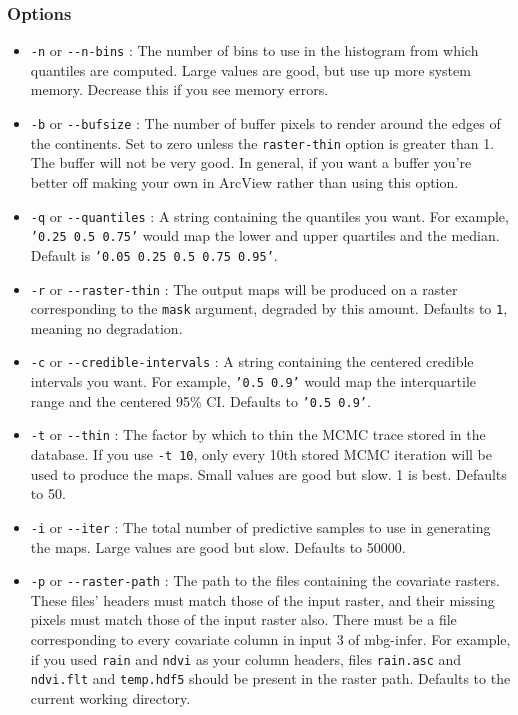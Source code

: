 \subsubsection{Options%
}
%
\begin{itemize}

\item \texttt{-n} or \texttt{-{}-n-bins} : The number of bins to use in the histogram from which quantiles
are computed. Large values are good, but use up more system memory. Decrease this if you
see memory errors.

\item \texttt{-b} or \texttt{-{}-bufsize} : The number of buffer pixels to render around the edges of the
continents. Set to zero unless the \texttt{raster-thin} option is greater than 1. The buffer
will not be very good. In general, if you want a buffer you're better off making your
own in ArcView rather than using this option.

\item \texttt{-q} or \texttt{-{}-quantiles} : A string containing the quantiles you want. For example,
\texttt{'0.25 0.5 0.75'} would map the lower and upper quartiles and the median. Default is
\texttt{'0.05 0.25 0.5 0.75 0.95'}.

\item \texttt{-r} or \texttt{-{}-raster-thin} : The output maps will be produced on a raster corresponding
to the  \texttt{mask} argument, degraded by this amount. Defaults to \texttt{1}, meaning no
degradation.

\item \texttt{-c} or \texttt{-{}-credible-intervals} : A string containing the centered credible intervals
you want. For example, \texttt{'0.5 0.9'} would map the interquartile range and the centered
95\% CI. Defaults to \texttt{'0.5 0.9'}.

\item \texttt{-t} or \texttt{-{}-thin} : The factor by which to thin the MCMC trace stored in the database.
If you use \texttt{-t 10}, only every 10th stored MCMC iteration will be used to produce the maps.
Small values are good but slow. 1 is best. Defaults to 50.

\item \texttt{-i} or \texttt{-{}-iter} : The total number of predictive samples to use in generating the maps.
Large values are good but slow. Defaults to 50000.

\item \texttt{-p} or \texttt{-{}-raster-path} : The path to the files containing the covariate rasters. These
files' headers must match those of the input raster, and their missing pixels must match
those of the input raster also. There must be a file corresponding to every covariate column
in input 3 of mbg-infer. For example, if you used \texttt{rain} and \texttt{ndvi} as your column headers,
files \texttt{rain.asc} and \texttt{ndvi.flt} and \texttt{temp.hdf5} should be present in the raster path.
Defaults to the current working directory.


\end{itemize}
